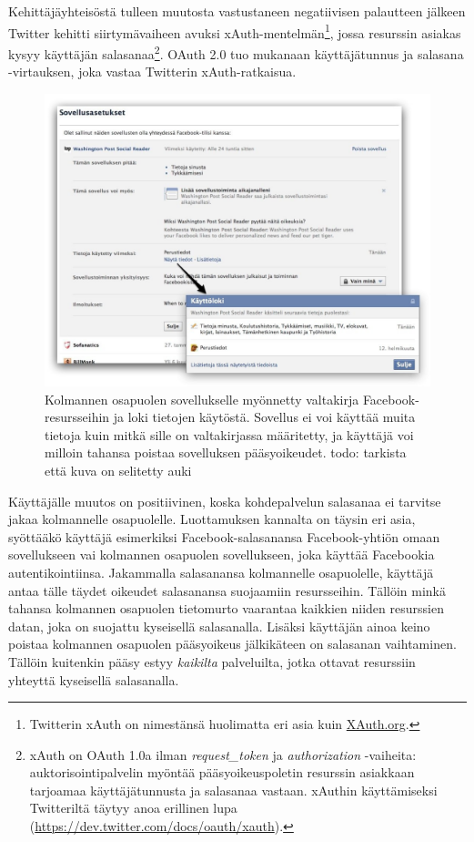 \documentclass[finnish,gradu]{tktltiki}
\begin{document}
  Kehittäjäyhteisöstä tulleen muutosta vastustaneen negatiivisen palautteen jälkeen Twitter kehitti siirtymävaiheen avuksi xAuth-mentelmän\footnote{Twitterin xAuth on nimestänsä huolimatta eri asia kuin \url{XAuth.org}.}, jossa resurssin asiakas kysyy käyttäjän salasanaa\footnote{xAuth on OAuth 1.0a ilman \emph{request\_token} ja \emph{authorization} -vaiheita: auktorisointipalvelin myöntää pääsyoikeuspoletin resurssin asiakkaan tarjoamaa käyttäjätunnusta ja salasanaa vastaan. xAuthin käyttämiseksi Twitteriltä täytyy anoa erillinen lupa (\url{https://dev.twitter.com/docs/oauth/xauth}).}. OAuth 2.0 tuo mukanaan käyttäjätunnus ja salasana -virtauksen, joka vastaa Twitterin xAuth-ratkaisua.


  \begin{figure}
    \centering
    \includegraphics[width=1.0\textwidth]{images/fb_app_acl.jpg}
    \caption{Kolmannen osapuolen sovellukselle myönnetty valtakirja Facebook-resursseihin ja loki tietojen käytöstä. Sovellus ei voi käyttää muita tietoja kuin mitkä sille on valtakirjassa määritetty, ja käyttäjä voi milloin tahansa poistaa sovelluksen pääsyoikeudet. todo: tarkista että kuva on selitetty auki}
    \label{fig:facebook_app_acl}
  \end{figure}

  Käyttäjälle muutos on positiivinen, koska kohdepalvelun salasanaa ei tarvitse jakaa kolmannelle osapuolelle. Luottamuksen kannalta on täysin eri asia, syöttääkö käyttäjä esimerkiksi Facebook-salasanansa Facebook-yhtiön omaan sovellukseen vai kolmannen osapuolen sovellukseen, joka käyttää Facebookia autentikointiinsa. Jakammalla salasanansa kolmannelle osapuolelle, käyttäjä antaa tälle täydet oikeudet salasanansa suojaamiin resursseihin. Tällöin minkä tahansa kolmannen osapuolen tietomurto vaarantaa kaikkien niiden resurssien datan, joka on suojattu kyseisellä salasanalla. Lisäksi käyttäjän ainoa keino poistaa kolmannen osapuolen pääsyoikeus jälkikäteen on salasanan vaihtaminen. Tällöin kuitenkin pääsy estyy \emph{kaikilta} palveluilta, jotka ottavat resurssiin yhteyttä kyseisellä salasanalla.
\end{document}
